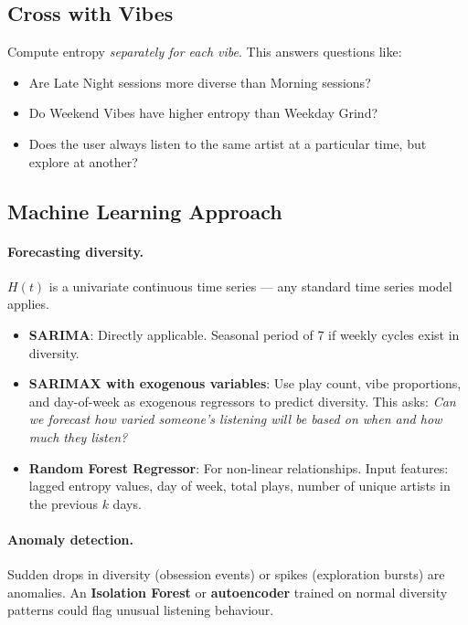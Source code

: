 \documentclass[12pt, a4paper]{article}
\begin{document}
\subsection{Cross with Vibes}

Compute entropy \emph{separately for each vibe}. This answers questions like:
\begin{itemize}
    \item Are Late Night sessions more diverse than Morning sessions?
    \item Do Weekend Vibes have higher entropy than Weekday Grind?
    \item Does the user always listen to the same artist at a particular
          time, but explore at another?
\end{itemize}

\subsection{Machine Learning Approach}

\paragraph{Forecasting diversity.}
$H(t)$ is a univariate continuous time series --- any standard time series
model applies.

\begin{itemize}
    \item \textbf{SARIMA}: Directly applicable. Seasonal period of 7 if
          weekly cycles exist in diversity.
    \item \textbf{SARIMAX with exogenous variables}: Use play count,
          vibe proportions, and day-of-week as exogenous regressors to
          predict diversity. This asks: \emph{Can we forecast how varied
          someone's listening will be based on when and how much they
          listen?}
    \item \textbf{Random Forest Regressor}: For non-linear relationships.
          Input features: lagged entropy values, day of week, total plays,
          number of unique artists in the previous $k$ days.
\end{itemize}

\paragraph{Anomaly detection.}
Sudden drops in diversity (obsession events) or spikes (exploration bursts)
are anomalies. An \textbf{Isolation Forest} or \textbf{autoencoder} trained
on normal diversity patterns could flag unusual listening behaviour.
\end{document}

